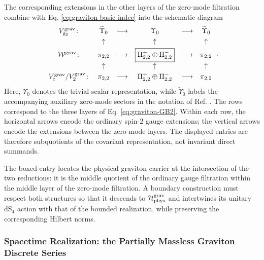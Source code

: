 \documentclass{SciPost}
\begin{document}
The corresponding extensions in the other layers of the zero-mode filtration combine with Eq. \eqref{eq:graviton-basic-indec} into the schematic diagram
\begin{align}\label{eq:graviton-complete}
\begin{array}{c@{\quad}c@{\quad}c@{\quad}c@{\quad}c@{\quad}c}
    V_{{\rm g}_2}^{\rm grav}\colon
    &\widetilde{\Upsilon}_0
    &\longrightarrow
    &\Upsilon_0
    &\longrightarrow
    &\widetilde{\Upsilon}_0
     \\[3pt]
    &\uparrow&&\uparrow&&\uparrow
     \\[3pt]
    {\cal W}^{\rm grav}\colon
    &\pi_{2,2}
    &\longrightarrow
    &\boxed{\Pi_{2,2}^{+}\oplus\Pi_{2,2}^{-}}
    &\longrightarrow
    &\pi_{2,2}
     \\[3pt]
    &\uparrow&&\uparrow&&\uparrow
     \\[3pt]
    V_{\rm c}^{\rm grav}/V_2^{\rm grav}\colon
    &\pi_{2,2}
    &\longrightarrow
    &\Pi_{2,2}^{+}\oplus\Pi_{2,2}^{-}
    &\longrightarrow
    &\pi_{2,2}
\end{array} \,.
\end{align}
Here, $\Upsilon_0$ denotes the trivial scalar representation, while $\widetilde{\Upsilon}_0$ labels the accompanying auxiliary zero-mode sectors in the notation of Ref. \cite{GravGB}. The rows correspond to the three layers of Eq. \eqref{eq:graviton-GB2}. Within each row, the horizontal arrows encode the ordinary spin-$2$ gauge extensions; the vertical arrows encode the extensions between the zero-mode layers. The displayed entries are therefore subquotients of the covariant representation, not invariant direct summands. 

The boxed entry locates the physical graviton carrier at the intersection of the two reductions: it is the middle quotient of the ordinary gauge filtration within the middle layer of the zero-mode filtration. A boundary construction must respect both structures so that it descends to ${\cal H}_{\rm phys}^{\rm grav}$ and intertwines its unitary $\mathrm{dS}_{4}$ action with that of the bounded realization, while preserving the corresponding Hilbert norms.


\subsubsection{Spacetime Realization: the Partially Massless Graviton Discrete Series} \label{sec:PM-spacetime}
\end{document}
